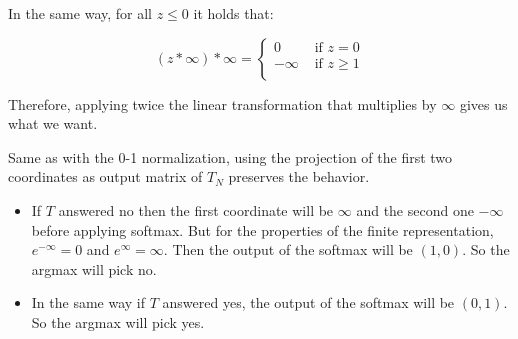 In the same way, for all $z \le 0$ it holds that:

\[(z *\infty) *\infty= \begin{cases}
    0           &\text{ if } z = 0 \\
    -\infty     &\text{ if } z \ge 1 \\
\end{cases}\]


Therefore, applying twice the linear transformation that multiplies by $\infty$ gives us what we want.

Same as with the 0-1 normalization, using the projection of the first two coordinates as output matrix of $T_N$ preserves the behavior.


\begin{itemize}
    \item If $T$ answered no then the first coordinate will be $\infty$ and the second one $-\infty$ before applying softmax. But for the properties of the finite representation, $e^{-\infty} = 0$ and $e^{\infty} = \infty$. Then the output of the softmax will be $(1,0)$. So the argmax will pick no.
    \item In the same way if $T$ answered yes, the output of the softmax will be $(0,1)$. So the argmax  will pick yes.
\end{itemize}

